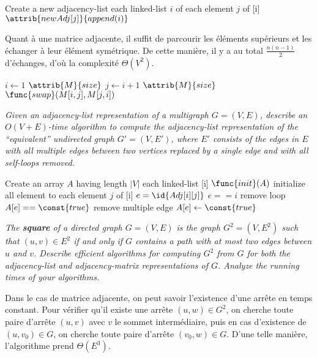 \begin{description}
\begin{ex}
\begin{codebox}
    \li Create a new adjacency-list 
    \li \For each linked-list $i$ of \Do
    \li \For each element $j$ of [i] \Do 
    \li $\attrib{newAdj[j]}{append(i)}$ \End \End
\end{codebox}
Quant à une matrice adjacente, il suffit de parcourir les éléments  supérieurs et les échanger à leur élément symétrique. De cette manière, il y a au total $\frac{n(n-1)}{2}$ d'échanges, d'où la complexité $\Theta(V^2)$.
\begin{codebox}
    \li \For $i \gets 1$ \To $\attrib{M}{size}$ \Do
    \li \For $j \gets i+1$ \To $\attrib{M}{size}$ \Do
    \li $\func{swap}(M[i,j],M[j,i])$ \End \End
\end{codebox}
\end{ex}
 \textit{Given an adjacency-list representation of a multigraph $G = (V, E)$, describe an $O(V + E)$-time algorithm to compute the adjacency-list representation of the \foreignquote{english}{equivalent} undirected graph $G' = (V,E')$, where $E'$ consists of the edges in $E$ with all multiple edges between two vertices replaced by a single edge and with all self-loops removed.}    
\begin{ex}
\begin{codebox}
    \li Create an array $A$ having length $|V|$ 
    \li \For each linked-list [i]\Do
    \li $\func{init}(A)$ \Comment initialize all element to 
    \li \For each element $j$ of [i] \Do 
    \li $e = \id{Adj[i][j]}$
    \li \If $e == i$ \Comment remove loop \Then 
    \li {} 
    \li \Else 
    \li \If $A[e] == \const{true}$ \Comment remove multiple edge \Then
    \li {} 
    \li \Else 
    \li $A[e] \gets \const{true}$\End
    \End \End
\end{codebox}
\end{ex}
 \textit{The \textbf{square} of a directed graph $G = (V, E)$ is the graph $G^2 = (V,E^2)$ such that $(u,v) \in E^2$   if and only if $G$ contains a path with at most two edges between $u$ and $v$. Describe efficient algorithms for computing $G^2$ from $G$ for both the adjacency-list and adjacency-matrix representations of $G$. Analyze the running times of your algorithms.}    
\begin{ex}
Dans le cas de matrice adjacente, on peut savoir l'existence d'une arrête en temps constant. Pour vérifier qu'il existe une arrête $(u,w) \in G^2$, on cherche toute paire d'arrête $(u,v)$ avec $v$ le sommet intermédiaire, puis en cas d'existence de $(u,v_0) \in G$, on cherche toute paire d'arrête $(v_0,w) \in G$. D'une telle manière, l'algorithme prend $\Theta(E^3)$.

\end{ex}
\end{description}
